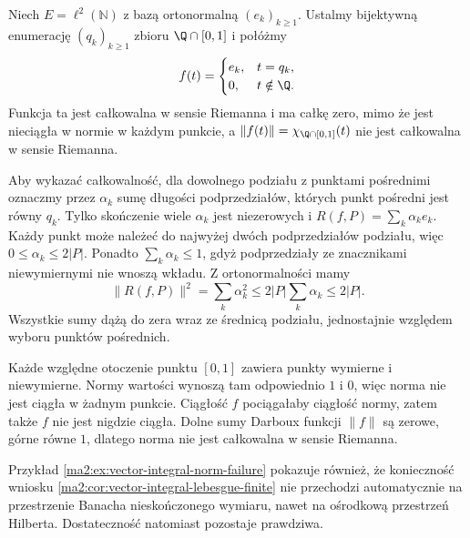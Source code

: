 \begin{przyklad}
\label{ma2:ex:vector-integral-norm-failure}
Niech $E=\ell^2(\mathbb N)$ z bazą
ortonormalną $(e_k)_{k\ge1}$.
Ustalmy bijektywną enumerację $(q_k)_{k\ge1}$
zbioru $\Q\cap[0,1]$ i połóżmy
\[
 f(t)=
 \begin{cases}
 e_k,&t=q_k,\\
 0,&t\notin\Q.
 \end{cases}
\]
Funkcja ta jest całkowalna w sensie Riemanna
i ma całkę zero, mimo że jest nieciągła
w normie w każdym punkcie, a
$\|f(t)\|=\chi_{\Q\cap[0,1]}(t)$
nie jest całkowalna w sensie Riemanna.

Aby wykazać całkowalność, dla dowolnego
podziału z punktami pośrednimi oznaczmy
przez $\alpha_k$ sumę długości podprzedziałów,
których punkt pośredni jest równy $q_k$.
Tylko skończenie wiele $\alpha_k$ jest
niezerowych i
$R(f,P)=\sum_k\alpha_ke_k$.
Każdy punkt może należeć do najwyżej
dwóch podprzedziałów podziału, więc
$0\le\alpha_k\le2|P|$. Ponadto
$\sum_k\alpha_k\le1$, gdyż podprzedziały
ze znacznikami niewymiernymi nie wnoszą wkładu.
Z ortonormalności mamy
\[
 \|R(f,P)\|^2=\sum_k\alpha_k^2
 \le 2|P|\sum_k\alpha_k\le2|P|.
\]
Wszystkie sumy dążą do zera wraz
ze średnicą podziału, jednostajnie
względem wyboru punktów pośrednich.

Każde względne otoczenie punktu $[0,1]$
zawiera punkty wymierne i niewymierne.
Normy wartości wynoszą tam odpowiednio $1$ i $0$,
więc norma nie jest ciągła w żadnym punkcie.
Ciągłość $f$ pociągałaby ciągłość normy,
zatem także $f$ nie jest nigdzie ciągła.
Dolne sumy Darboux funkcji $\|f\|$ są
zerowe, górne równe $1$, dlatego norma
nie jest całkowalna w sensie Riemanna.
\end{przyklad}

Przykład \ref{ma2:ex:vector-integral-norm-failure}
pokazuje również, że konieczność wniosku
\ref{ma2:cor:vector-integral-lebesgue-finite}
nie przechodzi automatycznie na przestrzenie
Banacha nieskończonego wymiaru, nawet
na ośrodkową przestrzeń Hilberta.
Dostateczność natomiast pozostaje prawdziwa.


